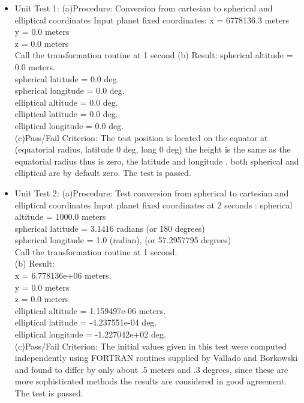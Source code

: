 \documentclass[twoside,11pt,titlepage]{report}
\begin{document}
\begin{itemize}

\item{Unit Test 1}\label{unit1}:\newline
(a)Procedure:
Conversion from cartesian to spherical and elliptical coordinates
Input planet fixed coordinates:
x = 6778136.3 meters \\
y = 0.0 meters\\
z = 0.0 meters\\
Call the transformation routine at 1 second
(b) Result:
spherical altitude = 0.0 meters.\\
spherical latitude = 0.0 deg.\\
spherical longitude = 0.0 deg.\\
elliptical altitude = 0.0 deg.\\
elliptical latitude = 0.0 deg.\\
elliptical longitude = 0.0 deg.\\
(c){Pass/Fail Criterion}:\newline
The test position is located on the equator
at (equatorial radius, latitude 0 deg, long 0 deg) the
height is the same as the equatorial radius thus is zero,
the latitude and longitude , both spherical and elliptical are
by default zero. The test is passed.

\item{Unit Test 2}:\label{unit2} \newline
(a)Procedure:
Test conversion from spherical to cartesian and elliptical coordinates
Input planet fixed coordinates at 2 seconds :
spherical altitude = 1000.0 meters\\
spherical latitude = 3.1416 radians (or 180 degrees)\\
spherical longitude = 1.0 (radian), (or 57.2957795 degrees)\\
Call the transformation routine at 1 second.\\
(b) Result:\\
x  = 6.778136e+06 meters.\\
y  = 0.0 meters\\
z  = 0.0 meters\\
elliptical altitude = 1.159497e-06 meters.\\
elliptical latitude = -4.237551e-04 deg.\\
elliptical longitude = -1.227042e+02  deg.\\
(c){Pass/Fail Criterion}:\newline
The initial values given in this test were computed independently
using FORTRAN routines supplied by Vallado \cite{VMcc} and Borkowski \cite{bor}
and found to differ by only about .5 meters and .3 degrees, since these are more
sophisticated methods the results are considered in good agreement.
The test is passed.


\end{itemize}
\end{document}
